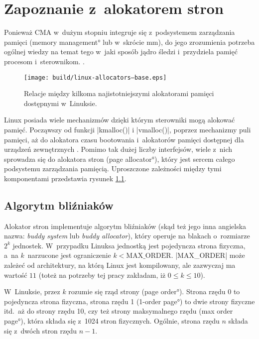 \chapter{Zapoznanie z~alokatorem stron}

Ponieważ CMA w~dużym stopniu integruje się z~podsystemem zarządzania
pamięci (\ang{memory management} lub w~skrócie mm), do jego
zrozumienia potrzeba ogólnej wiedzy na temat tego w~jaki sposób jądro
śledzi i~przydziela pamięć procesom i~sterownikom.  .

\begin{figure}[tbp]
  \centering
  \texttt{[image: build/linux-allocators--base.eps]}
  \caption{Relacje między kilkoma najistotniejszymi alokatorami
    pamięci dostępnymi w~Linuksie.}
  \label{fig:allocators-base}
\end{figure}

Linux posiada wiele mechanizmów dzięki którym sterowniki mogą
alokować pamięć.  Począwszy od funkcji \code|kmalloc()|
i \code|vmalloc()|, poprzez mechanizmy puli pamięci, aż do
alokatora czasu bootowania i~alokatorów pamięci dostępnej dla urządzeń
zewnętrznych \cite[rozdział 8]{bib:ldd3}.  Pomimo tak dużej liczby
interfejsów, wiele z~nich sprowadza się do alokatora stron (\ang{page
  allocator}), który jest sercem całego podsystemu zarządzania
pamięcią.  Uproszczone zależności między tymi komponentami przedstawia
rysunek \ref{fig:allocators-base}.

\section{Algorytm bliźniaków}

Alokator stron implementuje algorytm bliźniaków (skąd też jego inna
angielska nazwa: {\it buddy system} lub {\it buddy allocator}), który
operuje na blakach o~rozmiarze $2^k$ jednostek.  W~przypadku Linuksa
jednostką jest pojedyncza strona fizyczna, a~na $k$~narzucone jest
ograniczenie $k < \mathrm{MAX\_ORDER}$.  \code|MAX_ORDER| może
zależeć od architektury, na którą Linux jest kompilowany, ale
zazwyczaj ma wartość $11$ (toteż na potrzeby tej pracy zakładam, iż $0
\le k \le 10$).

W~Linuksie, przez $k$ rozumie się rząd strony (\ang{page order}).
Strona rzędu 0 to pojedyncza strona fizyczna, strona rzędu 1
(\ang{1-order page}) to dwie strony fizyczne itd.\ aż do strony rzędu
10, czy też strony maksymalnego rzędu (\ang{max order page}), która
składa się z~1024 stron fizycznych.  Ogólnie, strona rzędu $n$ składa
się z~dwóch stron rzędu $n-1$.

